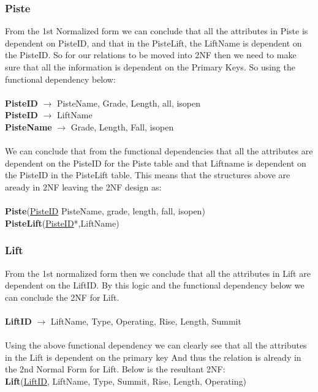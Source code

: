 \documentclass[12pt]{article}
\begin{document}
{\subsubsection{Piste}
From the 1st Normalized form we can conclude that all the attributes in Piste is dependent on PisteID, and that in the PisteLift, the LiftName is dependent on the PisteID. So for our relations to be moved into 2NF then  we need to make sure that all the information is dependent on the Primary Keys. So using the functional dependency below:~\\\\
\-\hspace{1.8cm}\textbf{PisteID} $\rightarrow$ PisteName, Grade, Length, all, isopen~\\
\-\hspace{1.8cm}\textbf{PisteID} $\rightarrow$ LiftName ~\\
\-\hspace{1.8cm}\textbf{PisteName} $\rightarrow$ Grade, Length, Fall, isopen~\\\\
We can conclude that from the functional dependencies that all the attributes are dependent on the PisteID for the Piste table and that Liftname is dependent on the PisteID in the PisteLift table. This means that the structures above are aready in 2NF leaving the 2NF design as:~\\\\
\-\hspace{1.8cm}\textbf{Piste}(\uline{PisteID} PisteName, grade, length, fall, isopen)~\\
\-\hspace{1.8cm}\textbf{PisteLift}(\uline{PisteID}*,LiftName)
\subsubsection{Lift}
From the 1st normalized form then we conclude that all the attributes in Lift are dependent on the LiftID. By this logic and the functional dependency below we can conclude the 2NF for Lift.~\\\\
\-\hspace{1.8cm}\textbf{LiftID} $\rightarrow$ LiftName, Type, Operating, Rise, Length, Summit~\\
\-~\\
Using the above functional dependency we can clearly see that all the attributes in the Lift is dependent on the primary key And thus the relation is already in the 2nd Normal Form for Lift. Below is the resultant 2NF:~\\
\-\hspace{1.8cm}\textbf{Lift}(\uline{LiftID}, LiftName, Type, Summit, Rise, Length, Operating)
}
\end{document}
